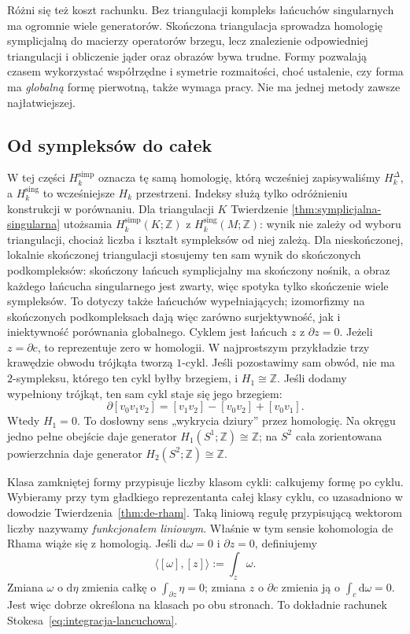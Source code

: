 \documentclass[11pt,a4paper,oneside]{report}
\newcommand{\Z}{\mathbb{Z}}
\newcommand{\dd}{\mathrm d}
\theoremstyle{plain}
\theoremstyle{definition}
\theoremstyle{remark}
\begin{document}
Różni się też koszt rachunku. Bez triangulacji
kompleks łańcuchów singularnych ma ogromnie
wiele generatorów. Skończona triangulacja
sprowadza homologię symplicjalną do macierzy
operatorów brzegu, lecz znalezienie odpowiedniej
triangulacji i obliczenie jąder oraz obrazów
bywa trudne. Formy pozwalają czasem wykorzystać
współrzędne i symetrie rozmaitości, choć
ustalenie, czy forma ma \emph{globalną}
formę pierwotną, także wymaga pracy.
Nie ma jednej metody zawsze najłatwiejszej.

\subsection*{Od sympleksów do całek}

W tej części $H_k^{\mathrm{simp}}$ oznacza tę samą homologię,
którą wcześniej zapisywaliśmy $H_k^\Delta$, a
$H_k^{\mathrm{sing}}$ to wcześniejsze $H_k$ przestrzeni.
Indeksy służą tylko odróżnieniu konstrukcji w porównaniu.
Dla triangulacji $K$ Twierdzenie
\ref{thm:symplicjalna-singularna} utożsamia
$H_k^{\mathrm{simp}}(K;\Z)$ z
$H_k^{\mathrm{sing}}(M;\Z)$: wynik nie zależy
od wyboru triangulacji, chociaż liczba i kształt
sympleksów od niej zależą. Dla nieskończonej, lokalnie
skończonej triangulacji stosujemy ten sam wynik do skończonych
podkompleksów: skończony łańcuch symplicjalny ma skończony
nośnik, a obraz każdego łańcucha singularnego jest zwarty,
więc spotyka tylko skończenie wiele sympleksów.
To dotyczy także łańcuchów wypełniających; izomorfizmy
na skończonych podkompleksach dają więc zarówno
surjektywność, jak i iniektywność porównania globalnego.
Cyklem jest łańcuch
$z$ z $\partial z=0$. Jeżeli $z=\partial c$,
to reprezentuje zero w homologii.
W najprostszym przykładzie trzy krawędzie
obwodu trójkąta tworzą $1$-cykl. Jeśli
pozostawimy sam obwód, nie ma $2$-sympleksu,
którego ten cykl byłby brzegiem, i
$H_1\cong\Z$. Jeśli dodamy wypełniony trójkąt,
ten sam cykl staje się jego brzegiem:
\[
 \partial[v_0v_1v_2]
 =[v_1v_2]-[v_0v_2]+[v_0v_1].
\]
Wtedy $H_1=0$. To dosłowny sens
„wykrycia dziury” przez homologię.
Na okręgu
jedno pełne obejście daje generator $H_1(S^1;\Z)
\cong\Z$; na $S^2$ cała zorientowana powierzchnia
daje generator $H_2(S^2;\Z)\cong\Z$.

Klasa zamkniętej formy przypisuje liczby
klasom cykli: całkujemy formę po cyklu.
Wybieramy przy tym gładkiego reprezentanta całej klasy
cyklu, co uzasadniono w dowodzie Twierdzenia~\ref{thm:de-rham}.
Taką liniową regułę przypisującą wektorom
liczby nazywamy \emph{funkcjonałem liniowym}.
Właśnie w tym sensie kohomologia de Rhama
wiąże się z homologią. Jeśli
$\dd\omega=0$ i $\partial z=0$, definiujemy
\begin{equation}\label{eq:parowanie-de-rham-homologia}
 \langle[\omega],[z]\rangle:=\int_z\omega.
\end{equation}
Zmiana $\omega$ o $\dd\eta$ zmienia całkę o
$\int_{\partial z}\eta=0$; zmiana $z$ o
$\partial c$ zmienia ją o
$\int_c\dd\omega=0$. Jest więc dobrze określona
na klasach po obu stronach. To dokładnie
rachunek Stokesa~\eqref{eq:integracja-lancuchowa}.
\end{document}
